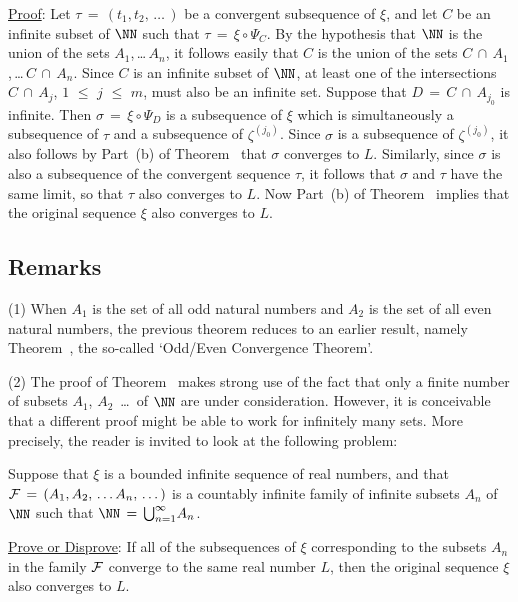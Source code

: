 {\V

        \underline{Proof}: Let ${\tau} \,=\, (t_{1},t_{2},\,{\ldots}\,)$ be a convergent subsequence of ${\xi}$,
    and let $C$ be an infinite subset of ${\NN}$ such that ${\tau} \,=\, {\xi}{\circ}{\Psi}_{C}$.
    By the hypothesis that ${\NN}$ is the union of the sets $A_{1}$,\,{\ldots}\,$A_{n}$,
    it follows easily that $C$ is the union of the sets $C\,{\cap}\,A_{1}$,\,{\ldots}\,$C\,{\cap}\,A_{n}$.
    Since $C$ is an infinite subset of ${\NN}$, at least one of the intersections $C\,{\cap}\,A_{j}$, $1\,\,{\leq}\,\,j\,\,{\leq}\,\,m$, must also be an infinite set.
    Suppose that $D \,=\, C\,{\cap}\,A_{j_{0}}$ is infinite.
    Then ${\sigma} \,=\, {\xi}{\circ}{\Psi}_{D}$ is a subsequence of ${\xi}$ which is simultaneously a subsequence of ${\tau}$ and a subsequence of ${\zeta}^{(j_{0})}$.
    Since ${\sigma}$ is a subsequence of ${\zeta}^{(j_{0})}$, it also follows by Part~(b) of Theorem~ that ${\sigma}$ converges to $L$.
   Similarly, since ${\sigma}$ is also a subsequence of the convergent sequence ${\tau}$, it follows that ${\sigma}$ and ${\tau}$ have the same limit, so that ${\tau}$ also converges to $L$.
    Now Part~(b) of Theorem~ implies that the original sequence ${\xi}$ also converges to $L$.
 
\V

            \subsection{\small{\bf Remarks}}
            \label{RemrkC30.40}

\hspace*{\parindent}(1) When $A_{1}$ is the set of all odd natural numbers and $A_{2}$ is the set of all even natural numbers,
    the previous theorem reduces to an earlier result, namely Theorem~, the so-called `Odd/Even Convergence Theorem'. 

\V

        (2) The proof of Theorem~ makes strong use of the fact that only a finite number of subsets $A_{1}$, $A_{2}$ \,{\ldots}\, of ${\NN}$ are under consideration.
    However, it is conceivable that a different proof might be able to work for infinitely many sets.
    More precisely, the reader is invited to look at the following problem:

        Suppose that ${\xi}$ is a bounded infinite sequence of real numbers, and that ${\cal F} \,=\, (A_{1},A_{2},\,{\ldots}\,A_{n},\,{\ldots}\,)$ is a countably infinite family of infinite subsets $A_{n}$ of ${\NN}$ such that ${\NN} \,=\, {\bigcup}_{n=1}^{{\infty}} A_{n}$.

        \underline{Prove or Disprove}: If all of the subsequences of ${\xi}$ corresponding to the subsets $A_{n}$ in the family ${\cal F}$ converge to the same real number $L$, then the original sequence ${\xi}$ also converges to $L$.
}%


